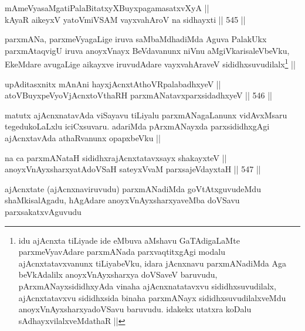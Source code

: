 
\begin{shl}
mAmeVyasaMgatiPalaBitatxyXBuyxpagamasatxvXyA || \\
kAyaR aikeyxV yatoV\s miVSAM vayxvahAroV na sidhayxti ||  545 ||  
\end{shl}

\begin{artha}
parxmANa, parxmeVyagaLige iruva saMbaMdhadiMda Aguva PalakUkx parxmAtaqvigU iruva anoyxVnayx BeVdavanunx niVnu aMgiVkarisaleVbeVku, EkeMdare avugaLige aikayxve iruvudAdare vayxvahAraveV sididhxsuvudilalx\footnote{idu ajAcnxta tiLiyade ide eMbuva aMshavu GaTAdigaLaMte parxmeVyavAdare parxmANada parxvaqtitxgAgi modalu ajAcnxtatavxvanunx tiLiyabeVku, idara jAcnxnavu parxmANadiMda Aga beVkAdalilx anoyxVnAyxsharxya doVSaveV baruvudu, pArxmANayxsididhxyAda vinaha ajAcnxnatatavxvu sididhxsuvudilalx, ajAcnxtatavxvu sididhxsida binaha parxmANayx sididhxsuvudilalxveMdu anoyxVnAyxsharxyadoVSavu baruvudu. idakekx utatxra koDalu sAdhayxvilalxveMdathaR ||} ||
\end{artha}

\begin{shl}
upAditasxnitx mAnAni hayxjAcnxtAthoVRpalabadhxyeV || \\
atoV\s BuyxpeVyoV\s jAcnxtoV\s thaRH parxmANatavxparxsidadhxyeV ||  546 ||  
\end{shl}

\begin{artha}
matutx ajAcnxnatavAda viSayavu tiLiyalu parxmANagaLanunx vidAvxMsaru tegedukoLaLxlu iciCxsuvaru. adariMda pArxmANayxda parxsididhxgAgi ajAcnxtavAda athaRvanunx opapxbeVku ||
\end{artha}


\begin{shl}
na ca parxmANataH sididhxrajAcnxtatavxsayx shakayxteV || \\
anoyxVnAyxsharxyatAdoVSaH sateyxVvaM parxsajeVdayxtaH ||  547 ||  
\end{shl}

\begin{artha}
ajAcnxtate (ajAcnxnaviruvudu) parxmANadiMda goVtAtxguvudeMdu shaMkisalAgadu, hAgAdare anoyxVnAyxsharxyaveMba doVSavu parxsakatxvAguvudu
\end{artha}

